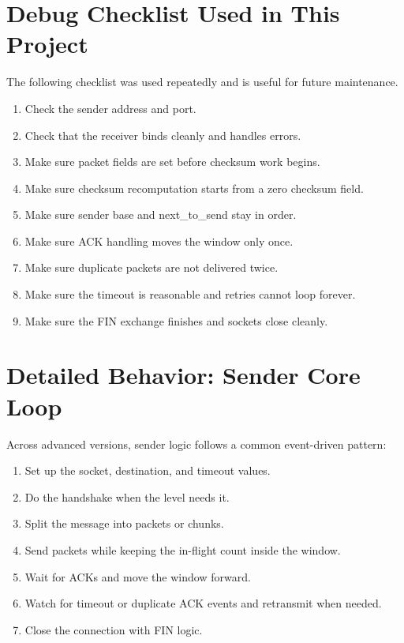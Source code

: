 \section{Debug Checklist Used in This Project}
The following checklist was used repeatedly and is useful for future maintenance.

\begin{enumerate}
    \item Check the sender address and port.
    \item Check that the receiver binds cleanly and handles errors.
    \item Make sure packet fields are set before checksum work begins.
    \item Make sure checksum recomputation starts from a zero checksum field.
    \item Make sure sender base and next\_to\_send stay in order.
    \item Make sure ACK handling moves the window only once.
    \item Make sure duplicate packets are not delivered twice.
    \item Make sure the timeout is reasonable and retries cannot loop forever.
    \item Make sure the FIN exchange finishes and sockets close cleanly.
\end{enumerate}

\clearpage
\section{Detailed Behavior: Sender Core Loop}
Across advanced versions, sender logic follows a common event-driven pattern:

\begin{enumerate}
    \item Set up the socket, destination, and timeout values.
    \item Do the handshake when the level needs it.
    \item Split the message into packets or chunks.
    \item Send packets while keeping the in-flight count inside the window.
    \item Wait for ACKs and move the window forward.
    \item Watch for timeout or duplicate ACK events and retransmit when needed.
    \item Close the connection with FIN logic.
\end{enumerate}

